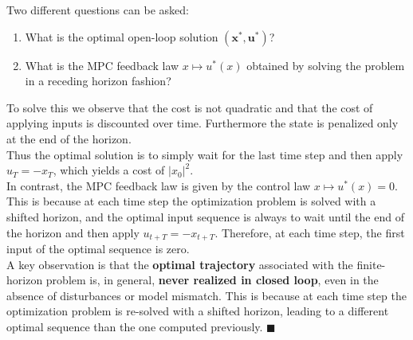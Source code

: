Two different questions can be asked:
\begin{enumerate}
    \item What is the optimal open-loop solution $(\mathbf{x}^*, \mathbf{u}^*)$?
    \item What is the MPC feedback law $x \mapsto u^*(x)$ obtained by solving the problem in a receding horizon fashion?
\end{enumerate}
To solve this we observe that the cost is not quadratic and that the cost of applying inputs is discounted over time. Furthermore the state is penalized only at the end of the horizon.\\
Thus the optimal solution is to simply wait for the last time step and then apply $u_{T} = -x_{T}$, which yields a cost of $|x_0|^2$.\\
In contrast, the MPC feedback law is given by the control law $x \mapsto u^*(x)=0$. This is because at each time step the optimization problem is solved with a shifted horizon, and the optimal input sequence is always to wait until the end of the horizon and then apply $u_{t+T}=-x_{t+T}$. Therefore, at each time step, the first input of the optimal sequence is zero.\\
A key observation is that the \textbf{optimal trajectory} associated with the finite-horizon problem is, in general, \textbf{never realized in closed loop}, even in the absence of disturbances or model mismatch. This is because at each time step the optimization problem is re-solved with a shifted horizon, leading to a different optimal sequence than the one computed previously.
$\blacksquare$

\medskip

